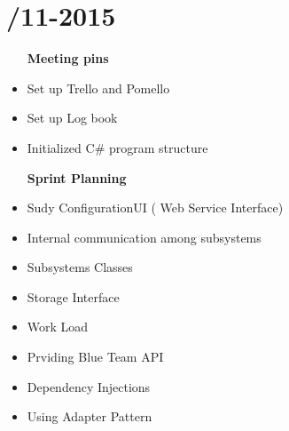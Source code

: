 \section{/11-2015}
\attend{\at}{\at}{\at}{\at}


\begin{itemize}
	\item [\textbf{Meeting pins}]
	\item Set up Trello and Pomello
	\item Set up Log book
	\item Initialized C\# program structure
\end{itemize}

\begin{itemize}
	\item [\textbf{Sprint Planning}]
	\item Sudy ConfigurationUI ( Web Service Interface)
	\item Internal communication among subsystems
	\item Subsystems Classes
	\item Storage Interface
	\item Work Load
	\item Prviding Blue Team API
	\item Dependency Injections
	\item Using Adapter Pattern
\end{itemize}